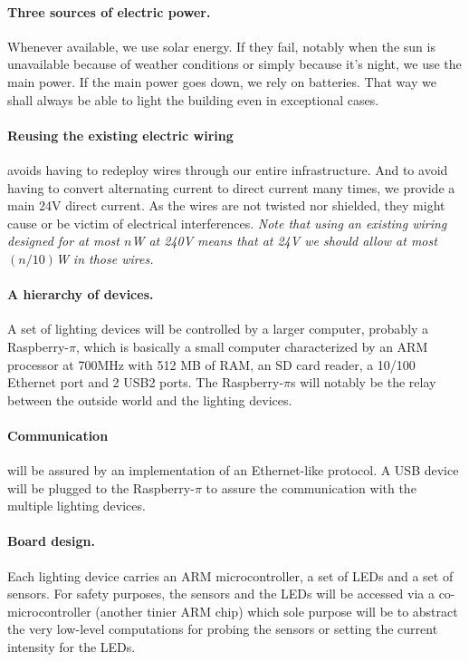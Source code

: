 \documentclass[12pt,twoside,a4paper]{article}
\def\RPI{Raspberry-$\pi$}
\begin{document}
\paragraph{Three sources of electric power.} Whenever available, we
use solar  energy. If they fail,  notably when the  sun is unavailable
because of weather conditions or simply because it's night, we use the
main power.  If the main power  goes down, we rely  on batteries. That
way we shall always be able  to light the building even in exceptional
cases. 

\paragraph{Reusing  the  existing electric  wiring}  avoids having  to
redeploy wires through our  entire infrastructure. And to avoid having
to  convert  alternating current  to  direct  current  many times,  we
provide a main  24V direct current.  As the wires  are not twisted nor
shielded, they  might cause or be victim  of electrical interferences.
\textit{Note that using  an existing wiring designed for  at most $n$W
  at 240V means that at 24V  we should allow at most $(n/10)$W in
  those wires.}

\paragraph{A hierarchy of devices.} A  set of lighting devices will be
controlled by a larger  computer, probably a Raspberry-$\pi$, which is
basically a small computer characterized by an ARM processor at 700MHz
with 512 MB  of RAM, an SD  card reader, a 10/100 Ethernet  port and 2
USB2 ports. The \RPI{}s will  notably be the relay between the outside
world and the lighting devices.

\paragraph{Communication} will  be assured by an  implementation of an
Ethernet-like protocol. A USB device  will be plugged to the \RPI{} to
assure the communication with the multiple lighting devices.

\paragraph{Board  design.}   Each   lighting  device  carries  an  ARM
microcontroller,  a set  of  LEDs and  a  set of  sensors. For  safety
purposes,  the   sensors  and  the   LEDs  will  be  accessed   via  a
co-microcontroller (another  tinier ARM chip) which  sole purpose will
be to abstract the very low-level computations for probing the sensors
or setting the current intensity for the LEDs.
\end{document}
